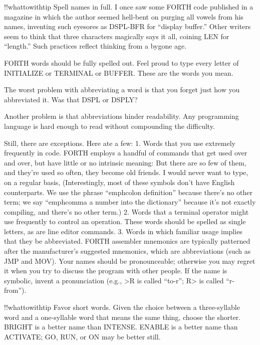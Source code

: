 !!whattowithtip{
Spell names in full.
}
I once saw some FORTH code published in a magazine in which the
author seemed hell-bent on purging all vowels from his names, inventing
such eyesores as DSPL-BFR for ``display buffer.'' Other writers seem to
think that three characters magically says it all, coining LEN for
``length.'' Such practices reflect thinking from a bygone age.

FORTH words should be fully spelled out.  Feel proud to type every
letter of INITIALIZE or TERMINAL or BUFFER.  These are the words
you mean.

The worst problem with abbreviating a word is that you forget just
how you abbreviated it.  Was that DSPL or DSPLY?

Another problem is that abbreviations hinder readability.  Any programming
language is hard enough to read without compounding the
difficulty.

Still, there are exceptions.  Here ate a few:
1. Words that you use extremely frequently in code. FORTH employs a handful
of commands that get used over and over, but have little or no intrinsic
meaning:
But there are so few of them, and they're used so often, they become old
friends.  I would never want to type, on a regular basis,
(Interestingly, most of these symbols don't have English counterparts.  We
use the phrase ``emph{colon} definition'' because there's no other term; we say
``emph{comma} a number into the dictionary'' because it's not exactly compiling,
and there's no other term.)
2. Words that a terminal operator might use frequently to control an operation.
These words should be spelled as single letters, as are line editor
commands.
3. Words in which familiar usage implies that they be abbreviated.  FORTH
assembler mnemonics are typically patterned after the manufacturer's suggested
mnemonics, which are abbreviations (such as JMP and MOV).
Your names should be pronounceable; otherwise you may regret it when
you try to discuss the program with other people.  If the name is symbolic,
invent a pronunciation (e.g., >R is called ``to-r''; R> is called
``r-from'').

!!whattowithtip{
Favor short words.
}
Given the choice between a three-syllable word and a one-syllable word
that means the same thing, choose the shorter.  BRIGHT is a better name
than INTENSE.  ENABLE is a better name than ACTIVATE; GO,
RUN, or ON may be better still.

